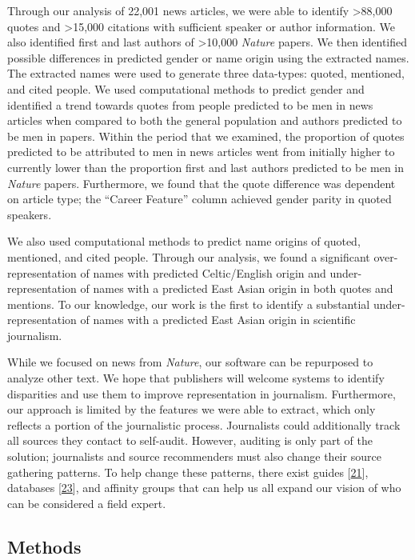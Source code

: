 Through our analysis of 22,001 news articles, we were able to identify \textgreater88,000 quotes and \textgreater15,000 citations with sufficient speaker or author information.
We also identified first and last authors of \textgreater10,000 \emph{Nature} papers.
We then identified possible differences in predicted gender or name origin using the extracted names.
The extracted names were used to generate three data-types: quoted, mentioned, and cited people.
We used computational methods to predict gender and identified a trend towards quotes from people predicted to be men in news articles when compared to both the general population and authors predicted to be men in papers.
Within the period that we examined, the proportion of quotes predicted to be attributed to men in news articles went from initially higher to currently lower than the proportion first and last authors predicted to be men in \emph{Nature} papers.
Furthermore, we found that the quote difference was dependent on article type; the ``Career Feature'' column achieved gender parity in quoted speakers.

We also used computational methods to predict name origins of quoted, mentioned, and cited people.
Through our analysis, we found a significant over-representation of names with predicted Celtic/English origin and under-representation of names with a predicted East Asian origin in both quotes and mentions.
To our knowledge, our work is the first to identify a substantial under-representation of names with a predicted East Asian origin in scientific journalism.

While we focused on news from \emph{Nature}, our software can be repurposed to analyze other text.
We hope that publishers will welcome systems to identify disparities and use them to improve representation in journalism.
Furthermore, our approach is limited by the features we were able to extract, which only reflects a portion of the journalistic process.
Journalists could additionally track all sources they contact to self-audit.
However, auditing is only part of the solution; journalists and source recommenders must also change their source gathering patterns.
To help change these patterns, there exist guides {[}\protect\hyperlink{ref-11fb3ccQ4}{21}{]}, databases {[}\protect\hyperlink{ref-1CFcA44h9}{23}{]}, and affinity groups that can help us all expand our vision of who can be considered a field expert.

\hypertarget{methods}{%
\subsection{Methods}\label{methods}}

